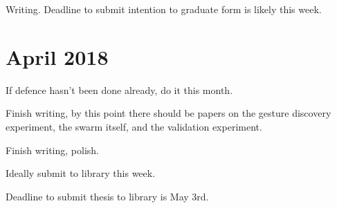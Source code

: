 
Writing. 
Deadline to submit intention to graduate form is likely this week. 

\section{April 2018} \label{section:April_2018}

If defence hasn't been done already, do it this month. 


Finish writing, by this point there should be papers on the gesture discovery experiment, the swarm itself, and the validation experiment. 


Finish writing, polish. 


Ideally submit to library this week.


Deadline to submit thesis to library is May 3rd.
